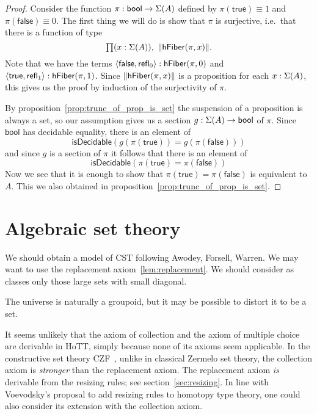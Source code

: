 \begin{proof}
Consider the function $\pi:\mathsf{bool}\to\Sigma(A)$ defined by 
$\pi(\mathsf{true})\equiv 1$ and $\pi(\mathsf{false})\equiv 0$. 
The first thing we will do is show that $\pi$ is surjective, 
i.e.\ that there is a function of type
\begin{equation*}
\prd{x:\susp(A)} \|\hfiber\pi{x}\|.
\end{equation*}
Note that we have the terms 
$\langle{\mathsf{false},\ensuremath{\mathsf{refl}_{0}}}\rangle:\mathsf{hFiber}(\pi,0)$ 
and $\langle{\mathsf{true},\ensuremath{\mathsf{refl}_{1}}}\rangle:\mathsf{hFiber}(\pi,1)$. 
Since $\|\mathsf{hFiber}(\pi,x)\|$ is a proposition for each 
$x:\Sigma(A)$, this gives us the proof by induction of 
the surjectivity of $\pi$.

By proposition~\ref{prop:trunc_of_prop_is_set} the suspension of 
a proposition is always a set, so our assumption gives us a 
section $g:\Sigma(A)\to\mathsf{bool}$ of $\pi$. 
Since $\mathsf{bool}$ has decidable equality, there is an element of
\begin{equation*}
\mathsf{isDecidable}(g(\pi(\mathsf{true}))= g(\pi(\mathsf{false})))
\end{equation*}
and since $g$ is a section of $\pi$ it follows that there is an element of
\begin{equation*}
\mathsf{isDecidable}(\pi(\mathsf{true})=\pi(\mathsf{false}))
\end{equation*}
Now we see that it is enough to show that 
$\pi(\mathsf{true})= \pi(\mathsf{false})$ is equivalent to $A$. 
This we also obtained in proposition~\ref{prop:trunc_of_prop_is_set}.
\end{proof}

\section{Algebraic set theory}
We should obtain a model of CST following Awodey, Forsell, Warren. 
We may want to use the replacement axiom~\ref{lem:replacement}.
We should consider as classes only those large sets with small diagonal.

The universe is naturally a groupoid, but it may be possible to distort it to be a set.

It seems unlikely that the axiom of collection and the axiom of multiple choice are derivable in HoTT,
simply because none of its axioms seem applicable.  In the constructive set theory CZF~\cite{aczel2001notes}, unlike in classical Zermelo
set theory, the collection axiom is \emph{stronger} than the replacement axiom. 
The replacement axiom \emph{is} derivable from the resizing rules; see section~\ref{sec:resizing}.
In line with Voevodsky's proposal to add resizing rules to homotopy type theory, one could also consider its extension with the
collection axiom.

